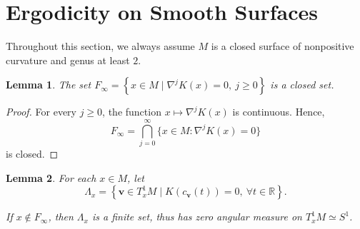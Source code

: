 \documentclass[reqno,11pt]{article}
\newtheorem{lemma}{Lemma}[section]
\theoremstyle{definition}
\theoremstyle{remark}
\numberwithin{equation}{section}
\begin{document}
\section{Ergodicity on Smooth Surfaces}\label{sec3}
Throughout this section, we always assume $M$ is a closed surface of nonpositive curvature and genus at least $2$.

\begin{lemma}\label{lem_3_1}
	The set $F_{\infty}=\left\{x\in M\mid \nabla^{j}K(x)=0,~j\geq 0\right\}$ is a closed set.
\end{lemma}

\begin{proof}
	For every $j\ge0$, the function $x\mapsto \nabla^{j}K(x)$ is continuous. Hence,
	\begin{displaymath}
		F_{\infty}=\bigcap_{j=0}^{\infty}\{x\in M:\nabla^{j}K(x)=0\}
	\end{displaymath}
	is closed.
\end{proof}

\begin{lemma}\label{lem_3_2}
	For each $x\in M$, let
	\begin{displaymath}
		\Lambda_{x} = \left\{\bm{v}\in T^{1}_{x}M \mid K(c_{\bm{v}}(t))=0,~\forall t\in\mathbb{R}\right\}.
	\end{displaymath}

	If $x\notin F_{\infty}$, then $\Lambda_x$ is a finite set, thus has zero angular measure on $T_x^1M\simeq S^1$.
\end{lemma}
\end{document}
